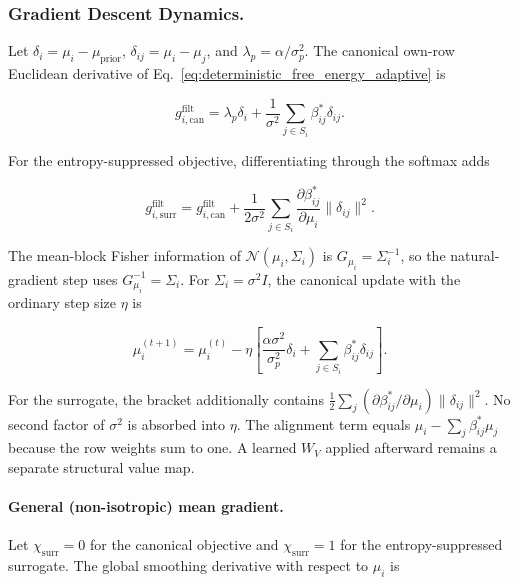 \documentclass[twoside,11pt]{article}
\begin{document}
\subsubsection{Gradient Descent Dynamics.}

Let $\delta_i=\mu_i-\mu_{\mathrm{prior}}$, $\delta_{ij}=\mu_i-\mu_j$, and $\lambda_p=\alpha/\sigma_p^2$. The canonical own-row Euclidean derivative of Eq.~\eqref{eq:deterministic_free_energy_adaptive} is

\begin{equation}
g_{i,\mathrm{can}}^{\mathrm{filt}}
=\lambda_p\delta_i
+\frac{1}{\sigma^2}\sum_{j\in S_i}\beta_{ij}^*\delta_{ij}.
\label{eq:isotropic_canonical_gradient}
\end{equation}

For the entropy-suppressed objective, differentiating through the softmax adds

\begin{equation}
g_{i,\mathrm{surr}}^{\mathrm{filt}}
=g_{i,\mathrm{can}}^{\mathrm{filt}}
+\frac{1}{2\sigma^2}
\sum_{j\in S_i}
\frac{\partial\beta_{ij}^*}{\partial\mu_i}
\|\delta_{ij}\|^2.
\label{eq:isotropic_surrogate_gradient}
\end{equation}

The mean-block Fisher information of $\mathcal{N}(\mu_i,\Sigma_i)$ is $G_{\mu_i}=\Sigma_i^{-1}$, so the natural-gradient step uses $G_{\mu_i}^{-1}=\Sigma_i$. For $\Sigma_i=\sigma^2I$, the canonical update with the ordinary step size $\eta$ is

\begin{equation}
\boxed{
\mu_i^{(t+1)}
=\mu_i^{(t)}
-\eta\left[
\frac{\alpha\sigma^2}{\sigma_p^2}\delta_i
+\sum_{j\in S_i}\beta_{ij}^*\delta_{ij}
\right].
}
\label{eq:isotropic_natural_update}
\end{equation}

For the surrogate, the bracket additionally contains $\frac{1}{2}\sum_j(\partial\beta_{ij}^*/\partial\mu_i)\|\delta_{ij}\|^2$. No second factor of $\sigma^2$ is absorbed into $\eta$. The alignment term equals $\mu_i-\sum_j\beta_{ij}^*\mu_j$ because the row weights sum to one. A learned $W_V$ applied afterward remains a separate structural value map.

\paragraph{General (non-isotropic) mean gradient.}
Let $\chi_{\mathrm{surr}}=0$ for the canonical objective and $\chi_{\mathrm{surr}}=1$ for the entropy-suppressed surrogate. The global smoothing derivative with respect to $\mu_i$ is
\end{document}
